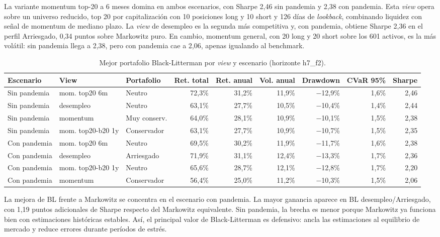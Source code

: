 La variante momentum top-20 a 6 meses domina en ambos escenarios, con Sharpe 2,46 sin pandemia y 2,38 con pandemia. Esta \textit{view} opera sobre un universo reducido, top 20 por capitalizaci\'on con 10 posiciones long y 10 short y 126 d\'ias de \textit{lookback}, combinando liquidez con se\~nal de momentum de mediano plazo. La \textit{view} de desempleo es la segunda m\'as competitiva y, con pandemia, obtiene Sharpe 2,36 en el perfil Arriesgado, 0,34 puntos sobre Markowitz puro. En cambio, momentum general, con 20 long y 20 short sobre los 601 activos, es la m\'as vol\'atil: sin pandemia llega a 2,38, pero con pandemia cae a 2,06, apenas igualando al benchmark.

\begin{table}[h]
\centering
\caption{Mejor portafolio Black-Litterman por \textit{view} y escenario
(horizonte h7\_f2).}
\label{tab:bl_results}
\scriptsize
\begin{tabular}{@{}lllrrrrrr@{}}
\toprule
Escenario & View & Portafolio & Ret. total & Ret. anual & Vol. anual &
Drawdown & CVaR 95\% & Sharpe \\
\midrule
Sin pandemia & mom. top20 6m & Neutro & 72,3\% & 31,2\% & 11,9\% &
$-$12,9\% & 1,6\% & 2,46 \\
Sin pandemia & desempleo & Neutro & 63,1\% & 27,7\% & 10,5\% & $-$10,4\% &
1,4\% & 2,44 \\
Sin pandemia & momentum & Muy conserv. & 64,0\% & 28,1\% & 10,9\% &
$-$10,1\% & 1,5\% & 2,38 \\
Sin pandemia & mom. top20-b20 1y & Conservador & 63,1\% & 27,7\% & 10,9\% &
$-$10,7\% & 1,5\% & 2,35 \\
\midrule
Con pandemia & mom. top20 6m & Neutro & 69,5\% & 30,2\% & 11,9\% &
$-$11,7\% & 1,6\% & 2,38 \\
Con pandemia & desempleo & Arriesgado & 71,9\% & 31,1\% & 12,4\% &
$-$13,3\% & 1,7\% & 2,36 \\
Con pandemia & mom. top20-b20 1y & Neutro & 65,6\% & 28,7\% & 12,1\% &
$-$12,8\% & 1,7\% & 2,20 \\
Con pandemia & momentum & Conservador & 56,4\% & 25,0\% & 11,2\% &
$-$10,3\% & 1,5\% & 2,06 \\
\bottomrule
\end{tabular}
\end{table}

La mejora de BL frente a Markowitz se concentra en el escenario con pandemia. La mayor ganancia aparece en BL desempleo/Arriesgado, con 1,19 puntos adicionales de Sharpe respecto del Markowitz equivalente. Sin pandemia, la brecha es menor porque Markowitz ya funciona bien con estimaciones hist\'oricas estables. As\'i, el principal valor de Black-Litterman es defensivo: ancla las estimaciones al equilibrio de mercado y reduce errores durante per\'iodos de estr\'es.

